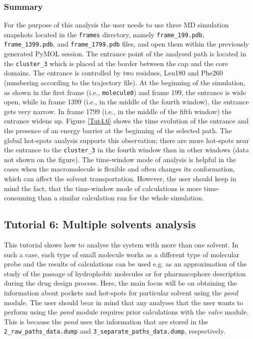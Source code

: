 \documentclass[9pt,tutorial, pubversion]{livecoms}
\begin{document}
\subsubsection{Summary}
For the purpose of this analysis the user needs to use three MD simulation snapshots located in the \texttt{frames} directory, namely \texttt{frame\_199.pdb}, \texttt{frame\_1399.pdb}, and \texttt{frame\_1799.pdb} files, and open them within the previously generated PyMOL session. The entrance point of the analysed path is located in the \texttt{cluster\_3} which is placed at the border between the cap and the core domains. The entrance is controlled by two residues, Leu180 and Phe260 (numbering according to the trajectory file). At the beginning of the simulation, as shown in the first frame (i.e., \texttt{molecule0}) and frame 199, the entrance is wide open, while in frame 1399 (i.e., in the middle of the fourth window), the entrance gets very narrow. In frame 1799 (i.e., in the middle of the fifth window) the entrance widens up. Figure \ref{Tut4.6} shows the time evolution of the entrance and the presence of an energy barrier at the beginning of the selected path. The global hot-spots analysis supports this observation; there are more hot-spots near the entrance to the \texttt{cluster\_3} in the fourth window than in other windows (data not shown on the figure). The time-window mode of analysis is helpful in the cases when the macromolecule is flexible and often changes its conformation, which can affect the solvent transportation. However, the user should keep in mind the fact, that the time-window mode of calculations is more time-consuming than a similar calculation ran for the whole simulation.
\pagebreak

\subsection{Tutorial 6: Multiple solvents analysis}

This tutorial shows how to analyse the system with more than one solvent. In such a case, each type of small molecule works as a different type of molecular probe and the results of calculations can be used e.g. as an approximation of the study of the passage of hydrophobic molecules or for pharmacophore description during the drug design process. Here, the main focus will be on obtaining the information about pockets and hot-spots for particular solvent using the \emph{pond} module. The user should bear in mind that any analyses that the user wants to perform using the \emph{pond} module requires prior calculations with the \emph{valve} module. This is because the \emph{pond} uses the information that are stored in the \texttt{2\_raw\_paths\_data.dump} and \texttt{3\_separate\_paths\_data.dump}, respectively. 
\end{document}
